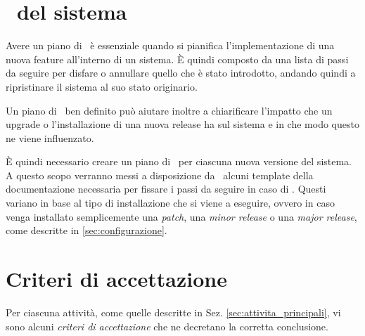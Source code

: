 \section{\rollback~del sistema}


	Avere un piano di \rollback~è essenziale quando si pianifica l'implementazione di una nuova feature all'interno di un sistema.
	È quindi composto da una lista di passi da seguire per disfare o annullare quello che è stato introdotto, andando quindi a ripristinare il sistema al suo stato originario.
	
	Un piano di \rollback~ben definito può aiutare inoltre a chiarificare l'impatto che un upgrade o l'installazione di una nuova release ha sul sistema e in che modo questo ne viene influenzato.

	È quindi necessario creare un piano di \rollback~per ciascuna nuova versione del sistema.
	A questo scopo verranno messi a disposizione da \azienda~alcuni template della documentazione necessaria per fissare i passi da seguire in caso di \rollback.
	Questi variano in base al tipo di installazione che si viene a eseguire, ovvero in caso venga installato semplicemente una \textit{patch}, una \textit{minor release} o una \textit{major release}, come descritte in \ref{sec:configurazione}.

\newpage
\section{Criteri di accettazione}

	Per ciascuna attività, come quelle descritte in Sez. \ref{sec:attivita_principali}, vi sono alcuni \textit{criteri di accettazione} che ne decretano la corretta conclusione.

